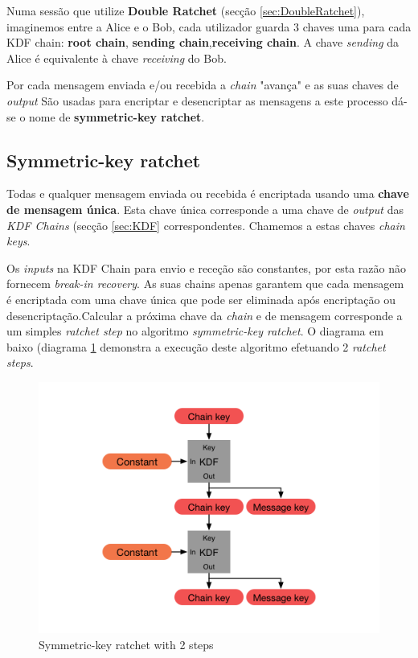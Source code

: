 Numa sessão que utilize \textbf{Double Ratchet} (secção \ref{sec:DoubleRatchet}), imaginemos entre a Alice e o Bob, cada utilizador guarda 3 chaves uma para cada KDF chain: \textbf{root chain}, \textbf{sending chain},\textbf{receiving chain}. A chave \textit{sending} da Alice é equivalente à chave \textit{receiving} do Bob.

Por cada mensagem enviada e/ou recebida a \emph{chain} "avança" e as suas chaves de \emph{output} São usadas para encriptar e desencriptar as mensagens a este processo dá-se o nome de \textbf{symmetric-key ratchet}.

\subsection{Symmetric-key ratchet}\label{sec:symkey}
Todas e qualquer mensagem enviada ou recebida é encriptada usando uma \textbf{chave de mensagem única}. Esta chave única corresponde a uma chave de \textit{output} das \textit{KDF Chains} (secção \ref{sec:KDF} correspondentes. Chamemos a estas chaves \textit{chain keys}.

Os \textit{inputs} na KDF Chain para envio e receção são constantes, por esta razão não fornecem \textit{break-in recovery}. As suas chains apenas garantem que cada mensagem é encriptada com uma chave única que pode ser eliminada após encriptação ou desencriptação.Calcular a próxima chave da \textit{chain} e de mensagem corresponde a um simples \textit{ratchet step} no algoritmo \textit{symmetric-key ratchet}.
O diagrama em baixo (diagrama \ref{diagram:skRatchet} demonstra a execução deste algoritmo efetuando 2 \textit{ratchet steps}.

\begin{figure}[H]
\begin{center}
\includegraphics[width=12cm]{img/skRatchet.png}
\caption{Symmetric-key ratchet with 2 steps}
\label{diagram:skRatchet}
\centering
\end{center}
\end{figure}

